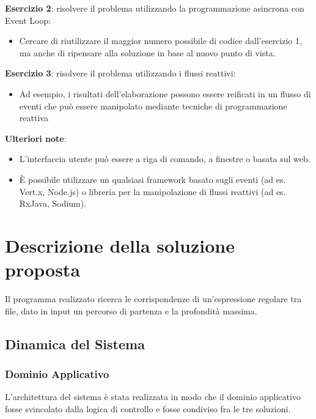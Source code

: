\documentclass[a4paper]{article}
\begin{document}
\textbf{Esercizio 2}: risolvere il problema utilizzando la programmazione asincrona con Event Loop:

\begin{itemize}
%
    \item Cercare di riutilizzare il maggior numero possibile di codice dall'esercizio 1, ma anche di ripensare alla soluzione in base al nuovo punto di vista.
%
\end{itemize}

\textbf{Esercizio 3}: risolvere il problema utilizzando i flussi reattivi:

\begin{itemize}
%
        \item Ad esempio, i risultati dell'elaborazione possono essere reificati in un flusso di eventi che pu\`o essere manipolato mediante tecniche di programmazione reattiva
%
    \end{itemize}

\textbf{Ulteriori note}:

\begin{itemize}
%
    \item L'interfaccia utente pu\`o essere a riga di comando, a finestre o basata sul web.
%
    \item \`E possibile utilizzare un qualsiasi framework basato sugli eventi (ad es. Vert.x, Node.js) o libreria per la manipolazione di flussi reattivi (ad es. RxJava, Sodium).
%
\end{itemize}

\section{Descrizione della soluzione proposta}\label{descrizione-della-soluzione-proposta}

Il programma realizzato ricerca le corrispondenze di un'espressione regolare tra file, dato in input un percorso di partenza e la profondit\`a massima.

\subsection{Dinamica del Sistema}

\subsubsection{Dominio Applicativo}

L'architettura del sistema \`e stata realizzata in modo che il dominio applicativo fosse svincolato dalla logica di controllo e fosse condiviso fra le tre soluzioni.
\end{document}
